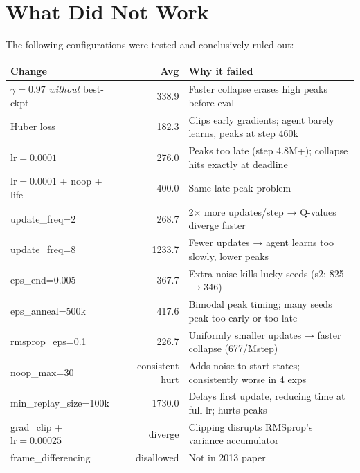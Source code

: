 \documentclass[11pt,a4paper]{article}
\begin{document}
\section{What Did Not Work}

The following configurations were tested and conclusively ruled out:

\begin{center}
\begin{tabular}{lrp{7.5cm}}
\toprule
\textbf{Change} & \textbf{Avg} & \textbf{Why it failed} \\
\midrule
$\gamma = 0.97$ \emph{without} best-ckpt & 338.9 & Faster collapse erases high peaks before eval \\
Huber loss & 182.3 & Clips early gradients; agent barely learns, peaks at step 460k \\
$\text{lr}=0.0001$ & 276.0 & Peaks too late (step 4.8M+); collapse hits exactly at deadline \\
$\text{lr}=0.0001$ + noop + life & 400.0 & Same late-peak problem \\
update\_freq=2 & 268.7 & 2$\times$ more updates/step → Q-values diverge faster \\
update\_freq=8 & 1233.7 & Fewer updates → agent learns too slowly, lower peaks \\
eps\_end=0.005 & 367.7 & Extra noise kills lucky seeds (s2: 825$\to$346) \\
eps\_anneal=500k & 417.6 & Bimodal peak timing; many seeds peak too early or too late \\
rmsprop\_eps=0.1 & 226.7 & Uniformly smaller updates → faster collapse (677/Mstep) \\
noop\_max=30 & consistent hurt & Adds noise to start states; consistently worse in 4 exps \\
min\_replay\_size=100k & 1730.0 & Delays first update, reducing time at full lr; hurts peaks \\
grad\_clip + $\text{lr}=0.00025$ & diverge & Clipping disrupts RMSprop's variance accumulator \\
frame\_differencing & disallowed & Not in 2013 paper \\
\bottomrule
\end{tabular}
\end{center}
\end{document}
